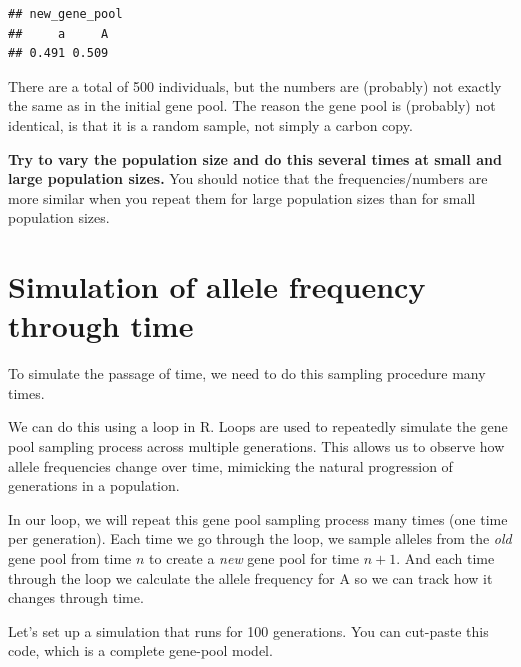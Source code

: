 \documentclass[
  a4paper]{book}
\begin{document}
\begin{verbatim}
## new_gene_pool
##     a     A 
## 0.491 0.509
\end{verbatim}

There are a total of 500 individuals, but the numbers are (probably) not exactly the same as in the initial gene pool. The reason the gene pool is (probably) not identical, is that it is a random sample, not simply a carbon copy.

\textbf{Try to vary the population size and do this several times at small and large population sizes.} You should notice that the frequencies/numbers are more similar when you repeat them for large population sizes than for small population sizes.

\hypertarget{simulation-of-allele-frequency-through-time}{%
\section{Simulation of allele frequency through time}\label{simulation-of-allele-frequency-through-time}}

To simulate the passage of time, we need to do this sampling procedure many times.

We can do this using a loop in R. Loops are used to repeatedly simulate the gene pool sampling process across multiple generations. This allows us to observe how allele frequencies change over time, mimicking the natural progression of generations in a population.

In our loop, we will repeat this gene pool sampling process many times (one time per generation). Each time we go through the loop, we sample alleles from the \emph{old} gene pool from time \(n\) to create a \emph{new} gene pool for time \(n+1\). And each time through the loop we calculate the allele frequency for A so we can track how it changes through time.

Let's set up a simulation that runs for 100 generations.
You can cut-paste this code, which is a complete gene-pool model.
\end{document}
